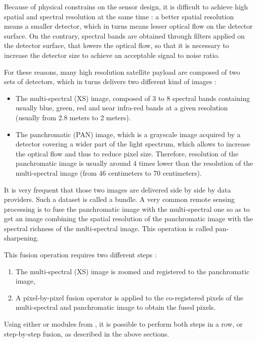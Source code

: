 Because of physical constrains on the sensor design, it is difficult
to achieve high spatial and spectral resolution at the same time : a
better spatial resolution means a smaller detector, which in turns
means lesser optical flow on the detector surface. On the contrary,
spectral bands are obtained through filters applied on the detector
surface, that lowers the optical flow, so that it is necessary to
increase the detector size to achieve an acceptable signal to noise
ratio.

For these reasons, many high resolution satellite payload are composed
of two sets of detectors, which in turns delivers two different kind
of images :

\begin{itemize}
\item The multi-spectral (XS) image, composed of 3 to 8 spectral bands
  containing usually blue, green, red and near infra-red bands at a
  given resolution (usually from 2.8 meters to 2 meters).
\item The panchromatic (PAN) image, which is a grayscale image acquired by a
  detector covering a wider part of the light spectrum, which allows
  to increase the optical flow and thus to reduce pixel
  size. Therefore, resolution of the panchromatic image is usually
  around 4 times lower than the resolution of the multi-spectral image
  (from 46 centimeters to 70 centimeters).
\end{itemize}

It is very frequent that those two images are delivered side by side
by data providers. Such a dataset is called a bundle. A very common
remote sensing processing is to fuse the panchromatic image with the
multi-spectral one so as to get an image combining the spatial
resolution of the panchromatic image with the spectral richness of the
multi-spectral image. This operation is called pan-sharpening.

This fusion operation requires two different steps :
\begin{enumerate}
\item The multi-spectral (XS) image is zoomed and registered to the
  panchromatic image,
\item A pixel-by-pixel fusion operator is applied to the co-registered
  pixels of the multi-spectral and panchromatic image to obtain the
  fused pixels.
\end{enumerate}

Using either \app or modules from \mont, it is
possible to perform both steps in a row, or step-by-step fusion, as
described in the above sections.

